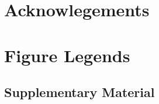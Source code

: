 \begin{bibunit}[naturemag]
\maketitle

\tableofcontents









\section{Acknowlegements}

{\footnotesize
% 
% 
}


\pagebreak
\FloatBarrier
\section{Figure Legends}

\end{bibunit}

\pagebreak
\FloatBarrier

\begin{bibunit}[naturemag]

\beginsupplement
\setcounter{secnumdepth}{4}
\section{Supplementary Material}



{\footnotesize
% 
% 
}
\pagebreak


\pagebreak

% 

\pagebreak


% 
% 
\end{bibunit}


